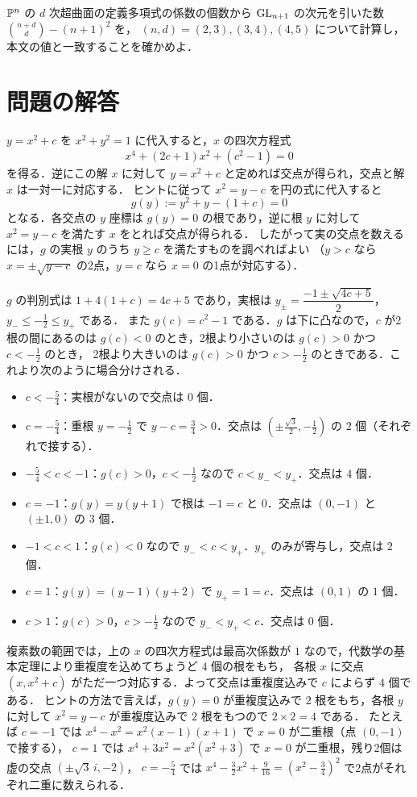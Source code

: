 $\mathbb{P}^n$ の $d$ 次超曲面の定義多項式の係数の個数から $\operatorname{GL}_{n+1}$ の次元を引いた数 $\binom{n+d}{d}-(n+1)^2$ を，
$(n,d)=(2,3),(3,4),(4,5)$ について計算し，本文の値と一致することを確かめよ．

\section*{問題の解答}

$y=x^2+c$ を $x^2+y^2=1$ に代入すると，$x$ の四次方程式
\[
  x^4+(2c+1)x^2+(c^2-1)=0
\]
を得る．逆にこの解 $x$ に対して $y=x^2+c$ と定めれば交点が得られ，交点と解 $x$ は一対一に対応する．
ヒントに従って $x^2=y-c$ を円の式に代入すると
\[
  g(y):=y^2+y-(1+c)=0
\]
となる．各交点の $y$ 座標は $g(y)=0$ の根であり，逆に根 $y$ に対して $x^2=y-c$ を満たす $x$ をとれば交点が得られる．
したがって実の交点を数えるには，$g$ の実根 $y$ のうち $y\ge c$ を満たすものを調べればよい
（$y>c$ なら $x=\pm\sqrt{y-c}$ の2点，$y=c$ なら $x=0$ の1点が対応する）．

$g$ の判別式は $1+4(1+c)=4c+5$ であり，実根は $y_\pm=\dfrac{-1\pm\sqrt{4c+5}}{2}$，$y_-\le-\tfrac12\le y_+$ である．
また $g(c)=c^2-1$ である．$g$ は下に凸なので，$c$ が2根の間にあるのは $g(c)<0$ のとき，2根より小さいのは $g(c)>0$ かつ $c<-\frac12$ のとき，
2根より大きいのは $g(c)>0$ かつ $c>-\frac12$ のときである．これより次のように場合分けされる．
\begin{itemize}
  \item $c<-\frac54$：実根がないので交点は $0$ 個．
  \item $c=-\frac54$：重根 $y=-\frac12$ で $y-c=\frac34>0$．交点は $(\pm\frac{\sqrt3}2,-\frac12)$ の $2$ 個（それぞれで接する）．
  \item $-\frac54<c<-1$：$g(c)>0$，$c<-\frac12$ なので $c<y_-<y_+$．交点は $4$ 個．
  \item $c=-1$：$g(y)=y(y+1)$ で根は $-1=c$ と $0$．交点は $(0,-1)$ と $(\pm1,0)$ の $3$ 個．
  \item $-1<c<1$：$g(c)<0$ なので $y_-<c<y_+$．$y_+$ のみが寄与し，交点は $2$ 個．
  \item $c=1$：$g(y)=(y-1)(y+2)$ で $y_+=1=c$．交点は $(0,1)$ の $1$ 個．
  \item $c>1$：$g(c)>0$，$c>-\frac12$ なので $y_-<y_+<c$．交点は $0$ 個．
\end{itemize}

複素数の範囲では，上の $x$ の四次方程式は最高次係数が $1$ なので，代数学の基本定理により重複度を込めてちょうど $4$ 個の根をもち，
各根 $x$ に交点 $(x,x^2+c)$ がただ一つ対応する．よって交点は重複度込みで $c$ によらず $4$ 個である．
ヒントの方法で言えば，$g(y)=0$ が重複度込みで $2$ 根をもち，各根 $y$ に対して $x^2=y-c$ が重複度込みで $2$ 根をもつので $2\times2=4$ である．
たとえば $c=-1$ では $x^4-x^2=x^2(x-1)(x+1)$ で $x=0$ が二重根（点 $(0,-1)$ で接する），
$c=1$ では $x^4+3x^2=x^2(x^2+3)$ で $x=0$ が二重根，残り2個は虚の交点 $(\pm\sqrt3\,i,-2)$，
$c=-\frac54$ では $x^4-\frac32x^2+\frac9{16}=(x^2-\frac34)^2$ で2点がそれぞれ二重に数えられる．

